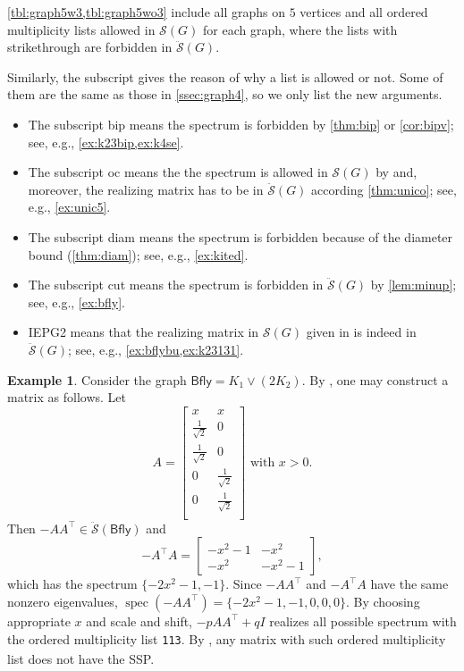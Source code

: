 \documentclass{article}
\theoremstyle{definition}
\newtheorem{example}[theorem]{Example}
\newcommand{\trans}{^\top}
\newcommand{\spec}{\operatorname{spec}}
\newcommand{\mptn}{\mathcal{S}}
\newcommand{\mdso}{\ddot{\mathcal{S}}}
\newcommand{\Bfly}{\mathsf{Bfly}}
\newcommand{\mtt}[2][]{\texttt{#2}\textsubscript{#1}}
\begin{document}
\cref{tbl:graph5w3,tbl:graph5wo3} include all graphs on $5$ vertices and all ordered multiplicity lists allowed in $\mptn(G)$ for each graph, where the lists with strikethrough are forbidden in $\mdso(G)$.  

Similarly, the subscript gives the reason of why a list is allowed or not.  Some of them are the same as those in \cref{ssec:graph4}, so we only list the new arguments.
\begin{itemize}
\item The subscript bip means the spectrum is forbidden by \cref{thm:bip} or \cref{cor:bipv}; see, e.g., \cref{ex:k23bip,ex:k4se}.
\item The subscript oc means the the spectrum is allowed in $\mptn(G)$ by \cite{IEPG2} and, moreover, the realizing matrix has to be in $\mdso(G)$ according \cref{thm:unico}; see, e.g., \cref{ex:unic5}.
\item The subscript diam means the spectrum is forbidden because of the diameter bound (\cref{thm:diam}); see, e.g., \cref{ex:kited}.
\item The subscript cut means the spectrum is forbidden in $\mdso(G)$ by \cref{lem:minup}; see, e.g., \cref{ex:bfly}.
\item IEPG2 means that the realizing matrix in $\mptn(G)$ given in \cite{IEPG2} is indeed in $\mdso(G)$; see, e.g., \cref{ex:bflybu,ex:k23131}.
\end{itemize}

\begin{example}
\label{ex:bflybu}
Consider the graph $\Bfly = K_1 \vee (2K_2)$.  By \cite{IEPG2,Kempton10}, one may construct a matrix as follows.  Let 
\[
    A = \begin{bmatrix}
        x & x \\
        \frac{1}{\sqrt{2}} & 0 \\
        \frac{1}{\sqrt{2}} & 0 \\
        0 & \frac{1}{\sqrt{2}} \\
        0 & \frac{1}{\sqrt{2}} \\
    \end{bmatrix}
    \text{ with }x > 0.
\]
Then $-AA\trans\in\mdso(\Bfly)$ and 
\[
    -A\trans A = \begin{bmatrix}
        -x^2 - 1 & -x^2 \\
        -x^2 & -x^2 - 1
    \end{bmatrix},
\]
which has the spectrum $\{-2x^2 - 1, -1\}$.  Since $-AA\trans$ and $-A\trans A$ have the same nonzero eigenvalues, $\spec(-AA\trans) = \{-2x^2 - 1, -1, 0, 0, 0\}$.  By choosing appropriate $x$ and scale and shift, $-pAA\trans + qI$ realizes all possible spectrum with the ordered multiplicity list \mtt{113}.  By \cite{IEPG2}, any matrix with such ordered multiplicity list does not have the SSP.
\end{example}
\end{document}

